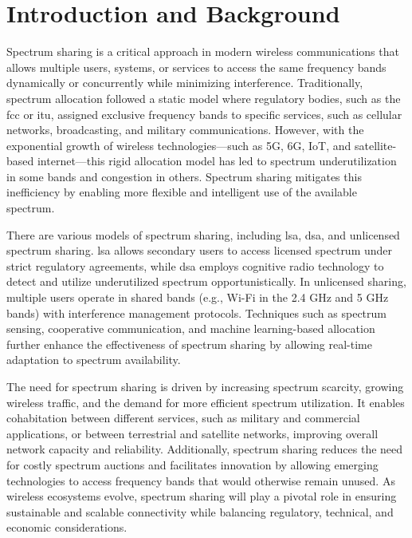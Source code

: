 \chapter{Introduction and Background}
\label{chap:introduction}

Spectrum sharing is a critical approach in modern wireless communications that allows multiple users, systems, or services to access the same frequency bands dynamically or concurrently while minimizing interference. Traditionally, spectrum allocation followed a static model where regulatory bodies, such as the \gls{fcc} or \gls{itu}, assigned exclusive frequency bands to specific services, such as cellular networks, broadcasting, and military communications. However, with the exponential growth of wireless technologies—such as 5G, 6G, IoT, and satellite-based internet—this rigid allocation model has led to spectrum underutilization in some bands and congestion in others. Spectrum sharing mitigates this inefficiency by enabling more flexible and intelligent use of the available spectrum. 

There are various models of spectrum sharing, including \gls{lsa}, \gls{dsa}, and unlicensed spectrum sharing. \gls{lsa} allows secondary users to access licensed spectrum under strict regulatory agreements, while \gls{dsa} employs cognitive radio technology to detect and utilize underutilized spectrum opportunistically. In unlicensed sharing, multiple users operate in shared bands (e.g., Wi-Fi in the 2.4 GHz and 5 GHz bands) with interference management protocols. Techniques such as spectrum sensing, cooperative communication, and machine learning-based allocation further enhance the effectiveness of spectrum sharing by allowing real-time adaptation to spectrum availability. 

The need for spectrum sharing is driven by increasing spectrum scarcity, growing wireless traffic, and the demand for more efficient spectrum utilization. It enables cohabitation between different services, such as military and commercial applications, or between terrestrial and satellite networks, improving overall network capacity and reliability. Additionally, spectrum sharing reduces the need for costly spectrum auctions and facilitates innovation by allowing emerging technologies to access frequency bands that would otherwise remain unused. As wireless ecosystems evolve, spectrum sharing will play a pivotal role in ensuring sustainable and scalable connectivity while balancing regulatory, technical, and economic considerations.

